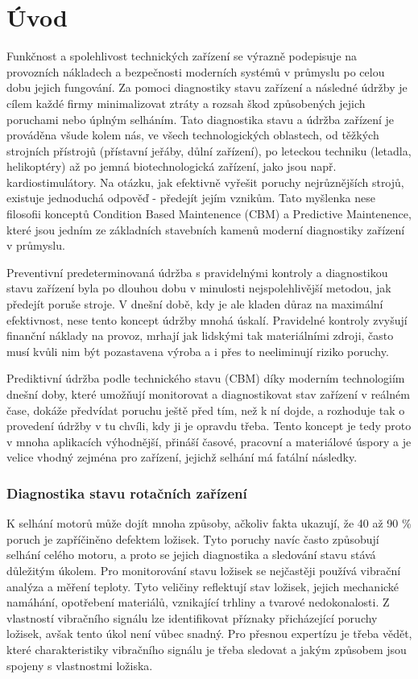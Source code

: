 \chapter{Úvod}

    Funkčnost a spolehlivost technických zařízení se výrazně podepisuje na provozních nákladech a bezpečnosti moderních systémů v průmyslu po celou dobu jejich fungování. 
    Za pomoci diagnostiky stavu zařízení a následné údržby je cílem každé firmy minimalizovat ztráty a rozsah škod způsobených jejich poruchami nebo úplným selháním. Tato diagnostika stavu a údržba zařízení je prováděna  všude kolem nás, ve všech technologických oblastech, od těžkých strojních přístrojů (přístavní jeřáby, důlní zařízení), po leteckou techniku (letadla, helikoptéry) až po jemná biotechnologická zařízení, jako jsou např. kardiostimulátory.
    Na otázku, jak efektivně vyřešit poruchy nejrůznějších strojů, existuje jednoduchá odpověď - předejít jejím vznikům. Tato myšlenka nese filosofii konceptů Condition Based Maintenence (CBM) a Predictive Maintenence, které jsou jedním ze základních stavebních kamenů moderní diagnostiky zařízení v průmyslu.
    
    Preventivní predeterminovaná údržba s pravidelnými kontroly a diagnostikou stavu zařízení byla po dlouhou dobu v minulosti nejspolehlivější metodou, jak předejít poruše stroje. V dnešní době, kdy je ale kladen důraz na maximální efektivnost, nese tento koncept údržby mnohá úskalí. Pravidelné kontroly zvyšují finanční náklady na provoz, mrhají jak lidskými tak materiálními zdroji, často musí kvůli nim být pozastavena výroba a i přes to neeliminují riziko poruchy.
    
    Prediktivní údržba podle technického stavu (CBM) díky moderním technologiím dnešní doby, které umožňují monitorovat a diagnostikovat stav zařízení v reálném čase, dokáže předvídat poruchu ještě před tím, než k ní dojde, a rozhoduje tak o provedení údržby v tu chvíli, kdy ji je opravdu třeba. Tento koncept je tedy proto v mnoha aplikacích výhodnější, přináší časové, pracovní a materiálové úspory a je velice vhodný zejména pro zařízení, jejichž selhání má fatální následky.

\subsection{Diagnostika stavu rotačních zařízení}
    K selhání motorů může dojít mnoha způsoby, ačkoliv fakta ukazují, že 40 až 90 \% poruch je zapříčiněno defektem ložisek. Tyto poruchy navíc často způsobují selhání celého motoru, a proto se jejich diagnostika a  sledování stavu stává důležitým úkolem. 
    Pro monitorování stavu ložisek se nejčastěji používá vibrační analýza a měření teploty. Tyto veličiny reflektují stav ložisek, jejich mechanické namáhání, opotřebení materiálů, vznikající trhliny a tvarové nedokonalosti.
    Z vlastností vibračního signálu lze identifikovat příznaky přicházející poruchy ložisek, avšak tento úkol není vůbec snadný. Pro přesnou expertízu je třeba vědět, které charakteristiky vibračního signálu je třeba sledovat a jakým způsobem jsou spojeny s vlastnostmi ložiska.     
    

